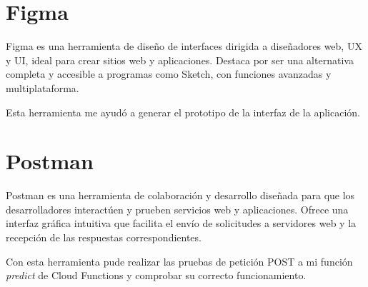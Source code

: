 \section{Figma}

Figma \cite{figma} es una herramienta de diseño de interfaces dirigida a diseñadores web, UX y UI, ideal para crear sitios web y aplicaciones. Destaca por ser una alternativa completa y accesible a programas como Sketch, con funciones avanzadas y multiplataforma.

Esta herramienta me ayudó a generar el prototipo de la interfaz de la aplicación.

\section{Postman}

Postman \cite{postman} es una herramienta de colaboración y desarrollo diseñada para que los desarrolladores interactúen y prueben servicios web y aplicaciones. Ofrece una interfaz gráfica intuitiva que facilita el envío de solicitudes a servidores web y la recepción de las respuestas correspondientes.

Con esta herramienta pude realizar las pruebas de petición POST a mi función \textit{predict} de Cloud Functions y comprobar su correcto funcionamiento.